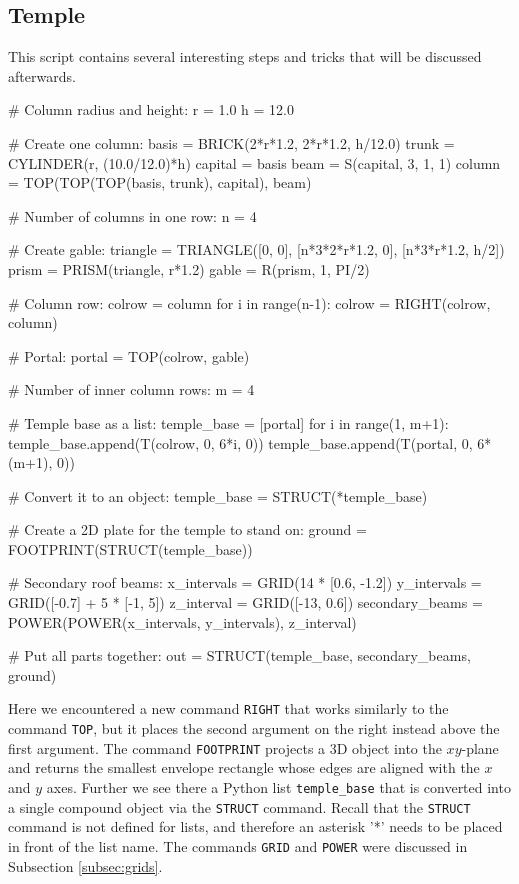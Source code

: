 \subsection{Temple}

This script contains several interesting steps and tricks that will 
be discussed afterwards.

{\small
\begin{bluecode}
# Column radius and height:
r = 1.0
h = 12.0

# Create one column:
basis = BRICK(2*r*1.2, 2*r*1.2, h/12.0) 
trunk = CYLINDER(r, (10.0/12.0)*h)
capital = basis
beam = S(capital, 3, 1, 1) 
column = TOP(TOP(TOP(basis, trunk), capital), beam)

# Number of columns in one row:
n = 4

# Create gable:
triangle = TRIANGLE([0, 0], [n*3*2*r*1.2, 0], [n*3*r*1.2, h/2])
prism = PRISM(triangle, r*1.2)
gable = R(prism, 1, PI/2)

# Column row:
colrow = column
for i in range(n-1):
   colrow = RIGHT(colrow, column)

# Portal:
portal = TOP(colrow, gable)

# Number of inner column rows:
m = 4

# Temple base as a list:
temple_base = [portal]
for i in range(1, m+1):
    temple_base.append(T(colrow, 0, 6*i, 0))
temple_base.append(T(portal, 0, 6*(m+1), 0))

# Convert it to an object:
temple_base = STRUCT(*temple_base)

# Create a 2D plate for the temple to stand on:
ground = FOOTPRINT(STRUCT(temple_base))

# Secondary roof beams:
x_intervals = GRID(14 * [0.6, -1.2])
y_intervals = GRID([-0.7] + 5 * [-1, 5])
z_interval = GRID([-13, 0.6])
secondary_beams = POWER(POWER(x_intervals, y_intervals), z_interval)

# Put all parts together:
out = STRUCT(temple_base, secondary_beams, ground)
\end{bluecode}
}
\noindent
Here we encountered a new command {\tt RIGHT}
that works similarly to the command {\tt TOP}, but it places
the second argument on the right instead above the
first argument. The command {\tt FOOTPRINT} projects 
a 3D object into the $xy$-plane and returns the smallest 
envelope rectangle whose edges are aligned with the $x$ and 
$y$ axes. Further we see there a Python list {\tt temple\_base}
that is converted into a single compound object via the {\tt STRUCT} 
command. Recall that the {\tt STRUCT} command is not defined for lists,
and therefore an asterisk '*' needs to be placed in front
of the list name. The commands {\tt GRID} and {\tt POWER} were
discussed in Subsection \ref{subsec:grids}.


